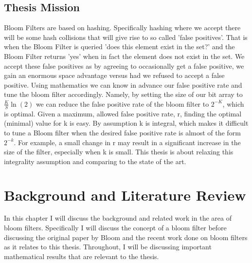 \documentclass[MScCS]{uccthesis}
\begin{document}
\section{Thesis Mission}
Bloom Filters are based on hashing. Specifically hashing where we accept there will be some hash collisions that will give rise to so called 'false positives'. That is when the Bloom Filter is queried 'does this element exist in the set?' and the Bloom Filter returns 'yes' when in fact the element does not exist in the set. We accept these false positives as by agreeing to occasionally get a false positive, we gain an enormous space advantage versus had we refused to accept a false positive.  Using mathematics we can know in advance our false positive rate and tune the bloom filter accordingly. Namely, by setting the size of our bit array to $\frac{K}{S}\ln(2)$ we can reduce the false positive rate of the bloom filter to $2^{-K}$, which is optimal. Given a maximum, allowed false positive rate, r, finding the optimal (minimal) value for k is easy. By assumption k is integral, which makes it difficult to tune a Bloom filter when the desired false positive rate is almost of the form $2^{-k}$. For example, a small change in r may result in a significant increase in the size of the filter, especially when k is small. This thesis is about relaxing this integrality assumption and comparing to the state of the art.

\chapter{Background and Literature Review}
In this chapter I will discuss the background and related work in the area of bloom filters. Specifically I will discuss the concept of a bloom filter before discussing the original paper by Bloom and the recent work done on bloom filters as it relates to this thesis. Throughout, I will be discussing important mathematical results that are relevant to the thesis.
\end{document}
